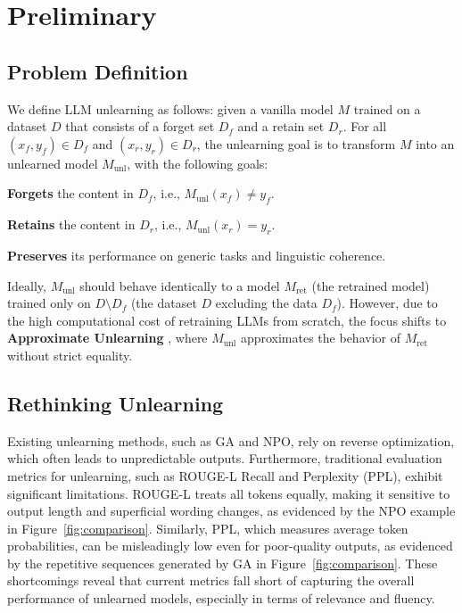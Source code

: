 \section{Preliminary}  
\subsection{Problem Definition}
We define LLM unlearning as follows:
given a vanilla model \( M \) trained on a dataset \( D \) that consists of a forget set \( D_f \) and a retain set \( D_r \).
For all \((x_f, y_f) \in D_f\) and \((x_r, y_r) \in D_r\), the unlearning goal is to transform \( M \) into an unlearned model \( M_{\text{unl}} \), with the following goals:

\textbf{Forgets} the content in \( D_f \), i.e., \( M_{\text{unl}}(x_f) \neq y_f \).

\textbf{Retains} the content in \( D_r \), i.e., \( M_{\text{unl}}(x_r) = y_r \).

\textbf{Preserves} its performance on generic tasks and linguistic coherence.

Ideally, \( M_{\text{unl}} \) should behave identically to a model \( M_{\text{ret}} \) (the retrained model) trained only on \( D \setminus D_f \) (the dataset \( D \) excluding the data \( D_f \)).
However, due to the high computational cost of retraining LLMs from scratch, the focus shifts to \textbf{Approximate Unlearning} \citep{eldan2023whosharrypotterapproximate}, where \( M_{\text{unl}} \) approximates the behavior of \( M_{\text{ret}} \) without strict equality.

\subsection{Rethinking Unlearning}
\label{rethinkunlearneval}
Existing unlearning methods, such as GA and NPO, rely on reverse optimization, which often leads to unpredictable outputs.
Furthermore, traditional evaluation metrics for unlearning, such as ROUGE-L Recall and Perplexity (PPL), exhibit significant limitations.
ROUGE-L treats all tokens equally, making it sensitive to output length and superficial wording changes, as evidenced by the NPO example in Figure~\ref{fig:comparison}.
Similarly, PPL, which measures average token probabilities, can be misleadingly low even for poor-quality outputs, as evidenced by the repetitive sequences generated by GA in Figure~\ref{fig:comparison}. 
These shortcomings reveal that current metrics fall short of capturing the overall performance of unlearned models, especially in terms of relevance and fluency.

